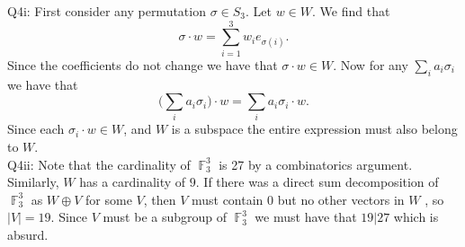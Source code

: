 \documentclass[letterpaper]{article}
\DeclareMathOperator{\F}{\mathbb{F}}
\begin{document}
 \noindent Q4i: 
First consider any permutation $\sigma \in S_3$. Let $w\in W$. We find that $$\sigma \cdot w = \sum_{i=1}^3 w_i e_{\sigma(i)}.$$
Since the coefficients do not change we have that $\sigma \cdot w \in W$. Now for any $\sum_{i}a_i \sigma_i$ we have that $$ \Big(\sum_i a_i \sigma_i\Big) \cdot w = \sum_{i} a_i\sigma_i \cdot w.$$
Since each $\sigma_i \cdot w \in W$, and $W$ is a subspace the entire expression must also belong to $W$. 
\newline \\ Q4ii: Note that the cardinality of $\F_3^3$ is 27 by a combinatorics argument. Similarly, $W$ has a cardinality of $9$. If there was a direct sum decomposition of $\F_3^3$ as $W\oplus V$ for some $V$, then $V$ must contain $0$ but no other vectors in $W$ , so $|V|= 19$. Since $V$ must be a subgroup of $\F_3^3$ we must have that $19|27$ which is absurd. 
\end{document}
